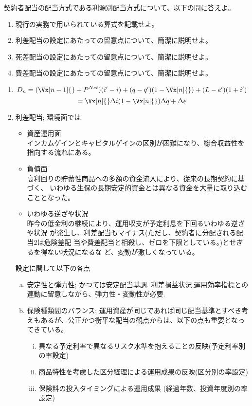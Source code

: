 \documentclass[report,gutter=10mm,fore-edge=10mm,uplatex,dvipdfmx]{jlreq}
\begin{document}
契約者配当の配当方式である利源別配当方式について、以下の問に答えよ。

\begin{enumerate} [(1)]
\item 現行の実務で用いられている算式を記載せよ。
\item 利差配当の設定にあたっての留意点について、簡潔に説明せよ。
\item 死差配当の設定にあたっての留意点について、簡潔に説明せよ。
\item 費差配当の設定にあたっての留意点について、簡潔に説明せよ。
\end{enumerate}
\begin{enumerate} [(1)]
 \item $$ D_n = (\Vx[n-1]{} + P^{Net})(i'-i)+(q-q')(1-\Vx[n]{})+(L-e')(1+i')$$
$$ = \Vx[n]{}\Delta i  (1-\Vx[n]{})\Delta q + \Delta e$$
 \item 利差配当; 環境面では
\begin{itemize}
 \item 資産運用面\\
インカムゲインとキャピタルゲインの区別が困難になり、総合収益性を指向する流れにある。
 \item 負債面\\
高利回りの貯蓄性商品への多額の資金流入により、従来の長期契約に基づく、
いわゆる生保の長期安定的資金とは異なる資金を大量に取り込むこととなった。
 \item いわゆる逆ざや状況\\
昨今の低金利の継続により、運用収支が予定利息を下回るいわゆる逆ざや状況
が発生し、利差配当もマイナス(ただし、契約者に分配される配当2は危険差配
当や費差配当と相殺し、ゼロを下限としている。)とせぎるを得ない状況になるな
ど、変動が激しくなっている。
\end{itemize}
設定に関して以下の各点
\begin{enumerate} [(a)]
 \item 安定性と弾力性; かつては安定配当基調.   利差損益状況,運用効率指標との連動に留意しながら、弾力性・変動性が必要.
 \item 保険種類間のバランス; 運用資産が同じであれば同じ配当基準とすべき考えもあるが、公正かつ衡平な配当の観点からは、以下の点も重要となってきている。
\begin{enumerate} [(i)]
 \item 異なる予定利率で異なるリスク水準を抱えることの反映(予定利率別の率設定)
 \item 商品特性を考慮した区分経理による運用成果の反映(区分別の率設定)
 \item 保険料の投入タイミングによる運用成果 (経過年数、投資年度別の率設定)

\end{enumerate}
\end{enumerate}
\end{enumerate}
\end{document}
